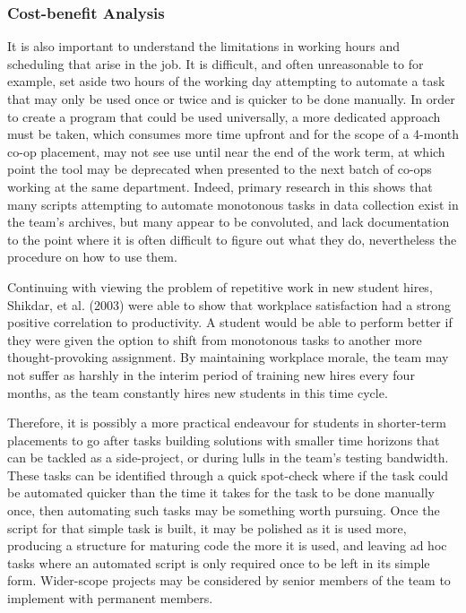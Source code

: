 \documentclass[12pt]{article}
\begin{document}
\subsubsection{Cost-benefit Analysis}
\indent\hspace{0.5in} It is also important to understand the limitations in working hours and scheduling that arise in the job. It is difficult, and often unreasonable to for example, set aside two hours of the working day attempting to automate a task that may only be used once or twice and is quicker to be done manually. In order to create a program that could be used universally, a more dedicated approach must be taken, which consumes more time upfront and for the scope of a 4-month co-op placement, may not see use until near the end of the work term, at which point the tool may be deprecated when presented to the next batch of co-ops working at the same department. Indeed, primary research in this shows that many scripts attempting to automate monotonous tasks in data collection exist in the team's archives, but many appear to be convoluted, and lack documentation to the point where it is often difficult to figure out what they do, nevertheless the procedure on how to use them. 

\indent\hspace{0.5in} Continuing with viewing the problem of repetitive work in new student hires, Shikdar, et al. (2003) were able to show that workplace satisfaction had a strong positive correlation to productivity. A student would be able to perform better if they were given the option to shift from monotonous tasks to another more thought-provoking assignment. By maintaining workplace morale, the team may not suffer as harshly in the interim period of training new hires every four months, as the team constantly hires new students in this time cycle.

\indent\hspace{0.5in} Therefore, it is possibly a more practical endeavour for students in shorter-term placements to go after tasks building solutions with smaller time horizons that can be tackled as a side-project, or during lulls in the team's testing bandwidth. These tasks can be identified through a quick spot-check where if the task could be automated quicker than the time it takes for the task to be done manually once, then automating such tasks may be something worth pursuing. Once the script for that simple task is built, it may be polished as it is used more, producing a structure for maturing code the more it is used, and leaving ad hoc tasks where an automated script is only required once to be left in its simple form. Wider-scope projects may be considered by senior members of the team to implement with permanent members.
\end{document}
